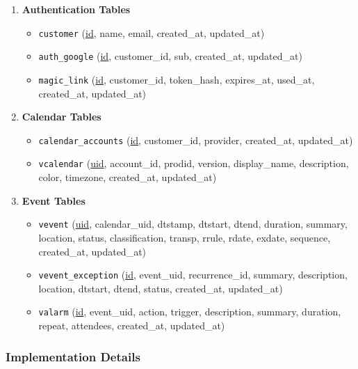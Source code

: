 \documentclass[12pt,a4paper]{report}
\begin{document}
\begin{enumerate}
    \item \textbf{Authentication Tables}
          \begin{itemize}
              \item \texttt{customer} (\underline{id}, name, email, created\_at, updated\_at)
              \item \texttt{auth\_google} (\underline{id}, customer\_id, sub, created\_at, updated\_at)
              \item \texttt{magic\_link} (\underline{id}, customer\_id, token\_hash, expires\_at, used\_at, created\_at, updated\_at)
          \end{itemize}

    \item \textbf{Calendar Tables}
          \begin{itemize}
              \item \texttt{calendar\_accounts} (\underline{id}, customer\_id, provider, created\_at, updated\_at)
              \item \texttt{vcalendar} (\underline{uid}, account\_id, prodid, version, display\_name, description, color, timezone, created\_at, updated\_at)
          \end{itemize}

    \item \textbf{Event Tables}
          \begin{itemize}
              \item \texttt{vevent} (\underline{uid}, calendar\_uid, dtstamp, dtstart, dtend, duration, summary, location, status, classification, transp, rrule, rdate, exdate, sequence, created\_at, updated\_at)
              \item \texttt{vevent\_exception} (\underline{id}, event\_uid, recurrence\_id, summary, description, location, dtstart, dtend, status, created\_at, updated\_at)
              \item \texttt{valarm} (\underline{id}, event\_uid, action, trigger, description, summary, duration, repeat, attendees, created\_at, updated\_at)
          \end{itemize}
\end{enumerate}

\subsubsection{Implementation Details}
\end{document}
